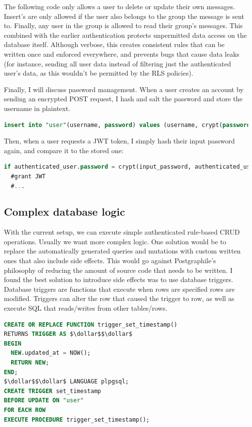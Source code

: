 \documentclass{l4proj}
\begin{document}
The following code only allows a user to delete or update their own messages. Insert's are only allowed if the user also belongs to the group the message is sent to. Finally, any user in the group is allowed to read their group's messages. This combined with the earlier authentication protects unpermitted data access on the database itself. Although verbose, this creates consistent rules that can be written once and enforced everywhere, and prevents bugs that cause data leaks (for instance, sending all user data instead of filtering just the authenticated user's data, as this wouldn't be permitted by the RLS policies).

Finally, I will discuss password management. When a user creates an account by sending an encrypted POST request, I hash and salt the password and store the username in plaintext.

\begin{lstlisting}[language=SQL, caption={Hashing and salting done with pgcrypto}]
insert into "user"(username, password) values (username, crypt(password, gen_salt('bf')));
\end{lstlisting}

Then, when a user requests a JWT token, I simply hash their input password again, and compare it to the stored one:
\begin{lstlisting}[language=SQL, caption={Hashing and salting done with pgcrypto}]
if authenticated_user.password = crypt(input_password, authenticated_user.password) then
  #grant JWT
  #...
\end{lstlisting}

\subsection{Complex database logic}
With the current setup, we can execute simple authenticated rule-based CRUD operations. Usually we want more complex logic. One solution would be to replace the automatically generated queries and mutations with custom written ones that also include side effects. This would go against Postgraphile's philosophy of reducing the amount of source code that needs to be written. I found the best solution to introduce side effects was to use database triggers. Database triggers are functions that execute when rows are specified rows are modified. Triggers can alter the row that caused the trigger to row, as well as execute SQL that reads/writes from other tables/rows. 


\begin{lstlisting}[language=SQL, caption={Definition of a trigger function which sets the rows' "updated\_at" column to be the current time, and a trigger which calls the function on a user whenever the user is updated.}]
CREATE OR REPLACE FUNCTION trigger_set_timestamp()
RETURNS TRIGGER AS $\dollar$$\dollar$ 
BEGIN
  NEW.updated_at = NOW();
  RETURN NEW;
END;
$\dollar$$\dollar$ LANGUAGE plpgsql;
CREATE TRIGGER set_timestamp
BEFORE UPDATE ON "user"
FOR EACH ROW
EXECUTE PROCEDURE trigger_set_timestamp();
\end{lstlisting}
\end{document}
